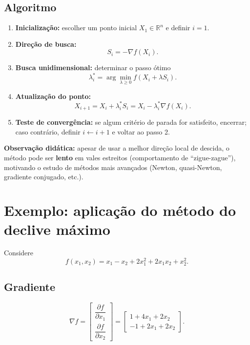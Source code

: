 \documentclass[9pt,a4paper]{extarticle}
\begin{document}
\subsection{Algoritmo}

\begin{enumerate}
    \item \textbf{Inicialização:} escolher um ponto inicial $X_1 \in \mathbb{R}^n$ e definir $i = 1$.
    \item \textbf{Direção de busca:}
    \[
      S_i = -\nabla f(X_i).
    \]
    \item \textbf{Busca unidimensional:} determinar o passo ótimo
    \[
      \lambda_i^\ast = \arg\min_{\lambda \ge 0} f(X_i + \lambda S_i).
    \]
    \item \textbf{Atualização do ponto:}
    \[
      X_{i+1} = X_i + \lambda_i^\ast S_i = X_i - \lambda_i^\ast \nabla f(X_i).
    \]
    \item \textbf{Teste de convergência:} se algum critério de parada for satisfeito, encerrar; caso contrário, definir $i \leftarrow i+1$ e voltar ao passo 2.
\end{enumerate}

\noindent \textbf{Observação didática:} apesar de usar a melhor direção local de descida, o método pode ser \textbf{lento} em vales estreitos (comportamento de ``zigue-zague''), motivando o estudo de métodos mais avançados (Newton, quasi-Newton, gradiente conjugado, etc.).

\section{Exemplo: aplicação do método do declive máximo}

Considere
\[
  f(x_1,x_2) = x_1 - x_2 + 2x_1^2 + 2x_1x_2 + x_2^2.
\]

\subsection{Gradiente}

\[
  \nabla f =
  \begin{bmatrix}
    \dfrac{\partial f}{\partial x_1} \\[0.5em]
    \dfrac{\partial f}{\partial x_2}
  \end{bmatrix}
  =
  \begin{bmatrix}
    1 + 4x_1 + 2x_2 \\
    -1 + 2x_1 + 2x_2
  \end{bmatrix}.
\]
\end{document}
